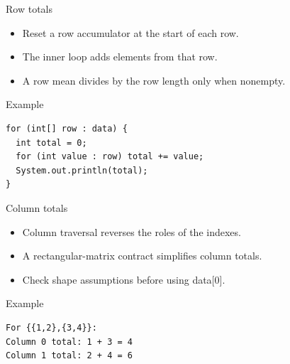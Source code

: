 \documentclass[10pt,aspectratio=169]{beamer}
\begin{document}
\begin{frame}[fragile,t]{Row totals}
\begin{itemize}
\item Reset a row accumulator at the start of each row.
\item The inner loop adds elements from that row.
\item A row mean divides by the row length only when nonempty.
\end{itemize}
\vspace{1mm}\begin{block}{Example}
\begin{lstlisting}
for (int[] row : data) {
  int total = 0;
  for (int value : row) total += value;
  System.out.println(total);
}
\end{lstlisting}
\end{block}
\end{frame}

\begin{frame}[fragile,t]{Column totals}
\begin{itemize}
\item Column traversal reverses the roles of the indexes.
\item A rectangular-matrix contract simplifies column totals.
\item Check shape assumptions before using data[0].
\end{itemize}
\vspace{1mm}\begin{block}{Example}
\begin{lstlisting}
For {{1,2},{3,4}}:
Column 0 total: 1 + 3 = 4
Column 1 total: 2 + 4 = 6
\end{lstlisting}
\end{block}
\end{frame}
\end{document}
